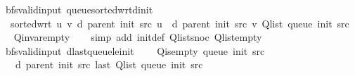 \begin{isabellebody}
\ {\isacharparenleft}{\kern0pt}\ bfs{\isacharunderscore}{\kern0pt}valid{\isacharunderscore}{\kern0pt}input{\isacharparenright}{\kern0pt}\ queue{\isacharunderscore}{\kern0pt}sorted{\isacharunderscore}{\kern0pt}wrt{\isacharunderscore}{\kern0pt}d{\isacharunderscore}{\kern0pt}init{\isacharcolon}{\kern0pt}\isanewline
\ \ \ {\isachardoublequoteopen}sorted{\isacharunderscore}{\kern0pt}wrt\ {\isacharparenleft}{\kern0pt}{\isasymlambda}u\ v{\isachardot}{\kern0pt}\ d\ {\isacharparenleft}{\kern0pt}parent\ {\isacharparenleft}{\kern0pt}init\ src{\isacharparenright}{\kern0pt}{\isacharparenright}{\kern0pt}\ u\ {\isasymle}\ d\ {\isacharparenleft}{\kern0pt}parent\ {\isacharparenleft}{\kern0pt}init\ src{\isacharparenright}{\kern0pt}{\isacharparenright}{\kern0pt}\ v{\isacharparenright}{\kern0pt}\ {\isacharparenleft}{\kern0pt}Q{\isacharunderscore}{\kern0pt}list\ {\isacharparenleft}{\kern0pt}queue\ {\isacharparenleft}{\kern0pt}init\ src{\isacharparenright}{\kern0pt}{\isacharparenright}{\kern0pt}{\isacharparenright}{\kern0pt}{\isachardoublequoteclose}\isanewline
%
\isadelimproof
\ \ %
\endisadelimproof
%
\isatagproof
{}\isamarkupfalse%
\ Q{\isachardot}{\kern0pt}invar{\isacharunderscore}{\kern0pt}empty\isanewline
\ \ \isamarkupfalse%
\ {\isacharparenleft}{\kern0pt}simp\ add{\isacharcolon}{\kern0pt}\ init{\isacharunderscore}{\kern0pt}def\ Q{\isachardot}{\kern0pt}list{\isacharunderscore}{\kern0pt}snoc\ Q{\isachardot}{\kern0pt}list{\isacharunderscore}{\kern0pt}empty{\isacharparenright}{\kern0pt}%
\endisatagproof
{\isafoldproof}%
%
\isadelimproof
\isanewline
%
\endisadelimproof
\isanewline
{}\isamarkupfalse%
\ {\isacharparenleft}{\kern0pt}\ bfs{\isacharunderscore}{\kern0pt}valid{\isacharunderscore}{\kern0pt}input{\isacharparenright}{\kern0pt}\ d{\isacharunderscore}{\kern0pt}last{\isacharunderscore}{\kern0pt}queue{\isacharunderscore}{\kern0pt}le{\isacharunderscore}{\kern0pt}init{\isacharcolon}{\kern0pt}\isanewline
\ \ \ {\isachardoublequoteopen}{\isasymnot}\ Q{\isacharunderscore}{\kern0pt}is{\isacharunderscore}{\kern0pt}empty\ {\isacharparenleft}{\kern0pt}queue\ {\isacharparenleft}{\kern0pt}init\ src{\isacharparenright}{\kern0pt}{\isacharparenright}{\kern0pt}{\isachardoublequoteclose}\isanewline
\ \ \isanewline
\ \ \ \ {\isachardoublequoteopen}d\ {\isacharparenleft}{\kern0pt}parent\ {\isacharparenleft}{\kern0pt}init\ src{\isacharparenright}{\kern0pt}{\isacharparenright}{\kern0pt}\ {\isacharparenleft}{\kern0pt}last\ {\isacharparenleft}{\kern0pt}Q{\isacharunderscore}{\kern0pt}list\ {\isacharparenleft}{\kern0pt}queue\ {\isacharparenleft}{\kern0pt}init\ src{\isacharparenright}{\kern0pt}{\isacharparenright}{\kern0pt}{\isacharparenright}{\kern0pt}{\isacharparenright}{\kern0pt}\ {\isasymle}\isanewline

\end{isabellebody}
